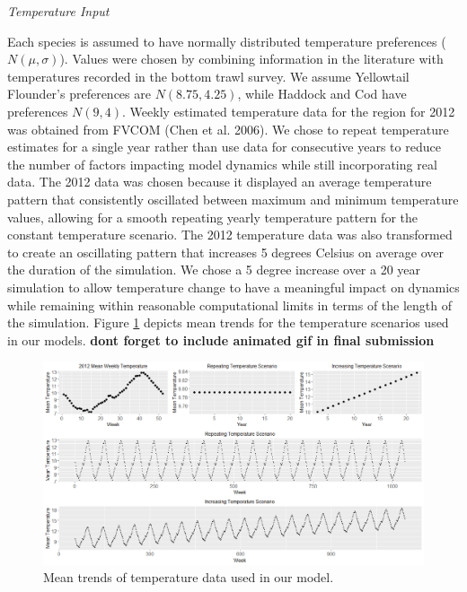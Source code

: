 \documentclass[
  12pt,
]{article}
\begin{document}
\emph{Temperature Input}

Each species is assumed to have normally distributed temperature preferences (\(N(\mu,\sigma)\)). Values were chosen by combining information in the literature with temperatures recorded in the bottom trawl survey. We assume Yellowtail Flounder's preferences are \(N(8.75,4.25)\), while Haddock and Cod have preferences \(N(9,4)\). Weekly estimated temperature data for the region for 2012 was obtained from FVCOM (Chen et al. 2006). We chose to repeat temperature estimates for a single year rather than use data for consecutive years to reduce the number of factors impacting model dynamics while still incorporating real data. The 2012 data was chosen because it displayed an average temperature pattern that consistently oscillated between maximum and minimum temperature values, allowing for a smooth repeating yearly temperature pattern for the constant temperature scenario. The 2012 temperature data was also transformed to create an oscillating pattern that increases 5 degrees Celsius on average over the duration of the simulation. We chose a 5 degree increase over a 20 year simulation to allow temperature change to have a meaningful impact on dynamics while remaining within reasonable computational limits in terms of the length of the simulation. Figure \ref{fig:temp-scenarios} depicts mean trends for the temperature scenarios used in our models. \textbf{dont forget to include animated gif in final submission}

\begin{figure}

{\centering \includegraphics[width=0.95\linewidth]{Images/TempScenarios} 

}

\caption{Mean trends of temperature data used in our model.}\label{fig:temp-scenarios}
\end{figure}
\end{document}
